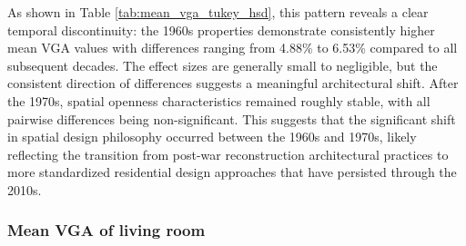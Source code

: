 As shown in Table \ref{tab:mean_vga_tukey_hsd}, this pattern reveals a clear temporal discontinuity: the 1960s properties demonstrate consistently higher 
mean VGA values with differences ranging from 4.88\% to 6.53\% compared to all subsequent decades. The 
effect sizes are generally small to negligible, but the consistent direction of differences suggests a 
meaningful architectural shift. After the 1970s, spatial openness characteristics remained roughly 
stable, with all pairwise differences being non-significant. This suggests 
that the significant shift in spatial design philosophy occurred between the 1960s and 1970s, likely 
reflecting the transition from post-war reconstruction architectural practices to more standardized 
residential design approaches that have persisted through the 2010s.

\subsubsection{Mean VGA of living room}
